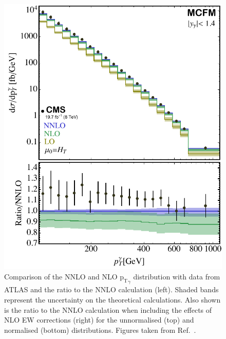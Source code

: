 \documentclass[a4paper,11pt,notoc]{article}
\newcommand{\pt}{\ensuremath{\mathrm{p_T}}}
\newcommand{\ptZ}{\ensuremath{\mathrm{p_T^{Z}}}}
\begin{document}
\begin{figure}[t!]
\centering
\includegraphics[width=0.495\columnwidth]{pt_gam.pdf} 
\caption{Comparison of the NNLO and NLO $\pt_{\gamma}$ distribution with data from ATLAS and the ratio to the NNLO calculation (left). Shaded bands represent the uncertainty on the theoretical calculations. Also shown is the ratio to the NNLO calculation when including the effects of NLO EW corrections (right) for the unnormalised (top) and normalised (bottom) distributions. Figures taken from Ref.~\cite{Campbell:2017dqk}. }
\label{fig:ptANNLO}
\end{figure}   


%
%
\end{document}
